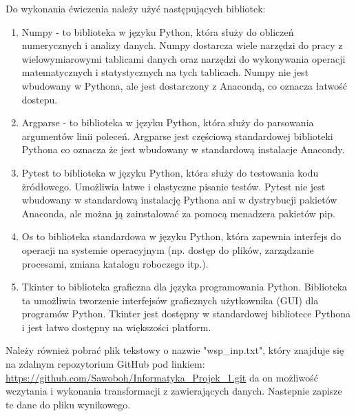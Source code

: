 Do wykonania ćwiczenia należy użyć następujących bibliotek:
\begin{enumerate}
\item Numpy - to biblioteka w języku Python, która służy do obliczeń numerycznych i analizy danych. Numpy dostarcza wiele narzędzi do pracy z wielowymiarowymi tablicami danych oraz narzędzi do wykonywania operacji matematycznych i statystycznych na tych tablicach. Numpy nie jest wbudowany w Pythona, ale jest dostarczony z Anacondą, co oznacza łatwość dostepu.
\item Argparse - to biblioteka w języku Python, która służy do parsowania argumentów linii poleceń. Argparse jest częściową standardowej biblioteki Pythona co oznacza że jest wbudowany w standardową instalacje Anacondy.
\item Pytest to biblioteka w języku Python, która służy do testowania kodu żródłowego. Umożliwia łatwe i elastyczne pisanie testów. Pytest nie jest wbudowany w standardową instalację Pythona ani w dystrybucji pakietów Anaconda, ale można ją zainstalować za pomocą menadzera pakietów pip.
\item Os to biblioteka standardowa w języku Python, która zapewnia interfejs do operacji na systemie operacyjnym (np. dostęp do plików, zarządzanie procesami, zmiana katalogu roboczego itp.). 
\item Tkinter to biblioteka graficzna dla języka programowania Python. Biblioteka ta umożliwia tworzenie interfejsów graficznych użytkownika (GUI) dla programów Python. Tkinter jest dostępny w standardowej bibliotece Pythona i jest łatwo dostępny na większości platform.

\end{enumerate}

Należy również pobrać plik tekstowy o nazwie "wsp\_{}inp.txt", który znajduje się na zdalnym repozytorium GitHub pod linkiem: \href{https://github.com/Sawoboh/Informatyka_Projek_1.git}{https://github.com/Sawoboh/Informatyka\_{}Projek\_{}1.git} da on możliwość wczytania i wykonania transformacji z zawierających danych. Nastepnie zapisze te dane do pliku wynikowego.  